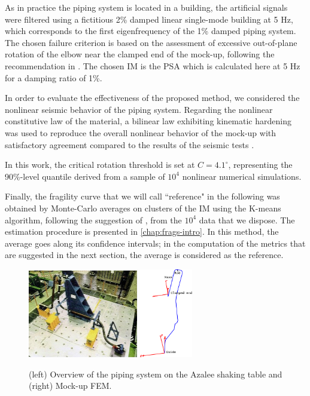 As in practice the piping system is located in a building, the artificial signals were filtered using a fictitious 2\% damped linear single-mode building at 5 Hz, which corresponds to the first eigenfrequency of the 1\% damped piping system. The chosen failure criterion is based on the assessment of excessive out-of-plane rotation of the elbow near the clamped end of the mock-up, following the recommendation in \cite{touboul_enhanced_2006}. {The chosen IM is the PSA which is calculated here at 5 Hz for a damping ratio of 1\%.}

In order to evaluate the effectiveness of the proposed method, we considered the nonlinear seismic behavior of the piping system. Regarding the nonlinear constitutive law of the material, a bilinear law exhibiting kinematic hardening was used to reproduce the overall nonlinear behavior of the mock-up with satisfactory agreement compared to the results of the seismic tests \citep{touboul_seismic_1999}. 

In this work, the critical rotation threshold is set at $C = 4.1^{\circ}$, representing the 90\%-level quantile derived from a sample of $10^4$ nonlinear numerical simulations.

Finally, the fragility curve that we will call ``reference" in the following was obtained by Monte-Carlo averages on clusters of the IM using the K-means algorithm, following the suggestion of \citet{trevlopoulos_parametric_2019}, from the $10^4$ data that we dispose. 
The estimation procedure is presented in \cref{chap:frags-intro}. In this method, the average goes along its confidence intervals; in the computation of the metrics that are suggested in the next section, the average is considered as the reference. %

\begin{figure}[!ht]
    \centering		
    \includegraphics[width=4.8cm]{figures/intro-frags/ASG.jpg}
    \hspace{1cm}
    \includegraphics[width=2.3cm]{figures/intro-frags/ASG_FEM.pdf}
    \caption{(left) Overview of the piping system on the Azalee shaking table and (right) Mock-up FEM.}
    \label{lowdoe:fig:ASG}
\end{figure}



